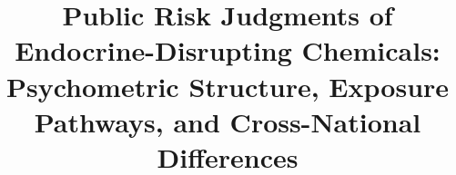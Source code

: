 \documentclass[english,man,floatsintext]{apa7}
\title{Public Risk Judgments of Endocrine-Disrupting Chemicals: Psychometric Structure, Exposure Pathways, and Cross-National Differences}
\begin{document}
\doublespacing
\raggedbottom
\setlength{\parskip}{0pt}

\maketitle

\begin{refsection}





\newpage
\printbibliography
\end{refsection}

\newpage
\begin{refsection}

\end{refsection}

\newpage
% 


% 
\end{document}
